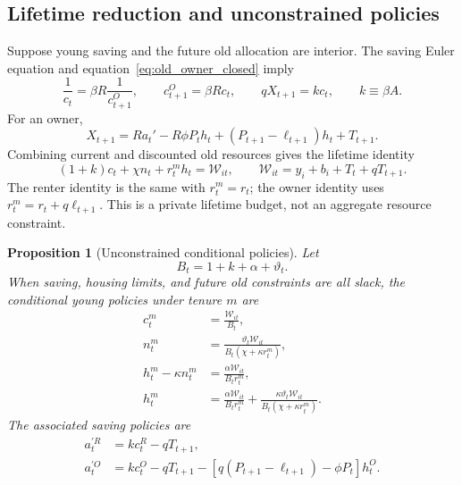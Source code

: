 \documentclass[11pt]{article}
\newtheorem{proposition}{Proposition}
\theoremstyle{definition}
\theoremstyle{remark}
\begin{document}
\subsection{Lifetime reduction and unconstrained policies}

Suppose young saving and the future old allocation are interior.  The saving
Euler equation and equation~\eqref{eq:old_owner_closed} imply
\begin{equation}
 \frac1{c_t}=\beta R\frac1{c_{t+1}^O},\qquad
 c_{t+1}^O=\beta Rc_t,\qquad
 qX_{t+1}=kc_t,\qquad k\equiv\beta A.
 \label{eq:euler_reduction}
\end{equation}
For an owner,
\begin{equation}
 X_{t+1}=Ra_t'-R\phi P_th_t+(P_{t+1}-\ell_{t+1})h_t+T_{t+1}.
 \label{eq:owner_old_resources}
\end{equation}
Combining current and discounted old resources gives the lifetime identity
\begin{equation}
 (1+k)c_t+\chi n_t+r_t^mh_t=\mathcal W_{it},\qquad
 \mathcal W_{it}=y_i+b_i+T_t+qT_{t+1}.
 \label{eq:lifetime_app}
\end{equation}
The renter identity is the same with $r_t^m=r_t$; the owner identity uses
$r_t^m=r_t+q\ell_{t+1}$.  This is a private lifetime budget, not an aggregate
resource constraint.

\begin{proposition}[Unconstrained conditional policies]
Let
\begin{equation}
 B_t=1+k+\alpha+\vartheta_t.
 \label{eq:B_app}
\end{equation}
When saving, housing limits, and future old constraints are all slack, the
conditional young policies under tenure $m$ are
\begin{align}
 c_t^m&=\frac{\mathcal W_{it}}{B_t},
 \label{eq:c_uncon}\\
 n_t^m&=\frac{\vartheta_t\mathcal W_{it}}
 {B_t(\chi+\kappa r_t^m)},
 \label{eq:n_uncon}\\
 h_t^m-\kappa n_t^m&=\frac{\alpha\mathcal W_{it}}{B_tr_t^m},
 \label{eq:s_uncon}\\
 h_t^m&=\frac{\alpha\mathcal W_{it}}{B_tr_t^m}
 +\frac{\kappa\vartheta_t\mathcal W_{it}}
 {B_t(\chi+\kappa r_t^m)}.
 \label{eq:h_uncon}
\end{align}
The associated saving policies are
\begin{align}
 a_t^{\prime R}&=kc_t^R-qT_{t+1},
 \label{eq:saving_r_closed}\\
 a_t^{\prime O}&=kc_t^O-qT_{t+1}
 -[q(P_{t+1}-\ell_{t+1})-\phi P_t]h_t^O.
 \label{eq:saving_o_closed}
\end{align}
\end{proposition}
\end{document}
